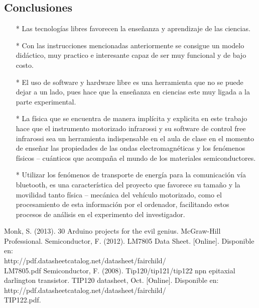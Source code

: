 \documentclass[12]{article}
\begin{document}
\begin{multicols}{2}
\section{Conclusiones}
\begin{enumerate}
\item[*] Las tecnologías libres favorecen la enseñanza y aprendizaje de las ciencias.
\item[*] Con las instrucciones mencionadas anteriormente se consigue un modelo didáctico, muy practico  e interesante capaz de ser muy funcional y de bajo costo.
\item[*] El uso de software y hardware libre es una herramienta que no se puede dejar a un lado, pues hace que la enseñanza en ciencias este muy ligada a la parte experimental.
\item[*] La física que se encuentra de manera implícita y explicita en este trabajo hace que el instrumento motorizado infrarossi y su software de control free infrarossi sea un herramienta indispensable  en el aula de clase en el momento de enseñar las  propiedades de las ondas electromagnéticas y los fenómenos físicos – cuánticos  que acompaña el mundo de los materiales  semiconductores.
\item[*] Utilizar los fenómenos de transporte de energía para la comunicación vía bluetooth, es una característica del proyecto que favorece su tamaño y la movilidad tanto física – mecánica del vehículo motorizado, como el procesamiento de esta información por el ordenador, facilitando estos procesos de análisis en el experimento del investigador. 
\end{enumerate}
\begin{thebibliography}{99}
 Monk, S. (2013). 30 Arduino projects for the evil genius. McGraw-Hill Professional.
 Semiconductor, F. (2012). LM7805 Data Sheet. [Online]. Disponible en:\\ http://pdf.datasheetcatalog.net/datasheet/fairchild/\\LM7805.pdf
 Semiconductor, F. (2008). Tip120/tip121/tip122 npn epitaxial darlington transistor. TIP120 datasheet, Oct. [Online]. Disponible en:\\ http://pdf.datasheetcatalog.net/datasheet/fairchild/\\TIP122.pdf.

\end{thebibliography}
\end{multicols}
\end{document}
